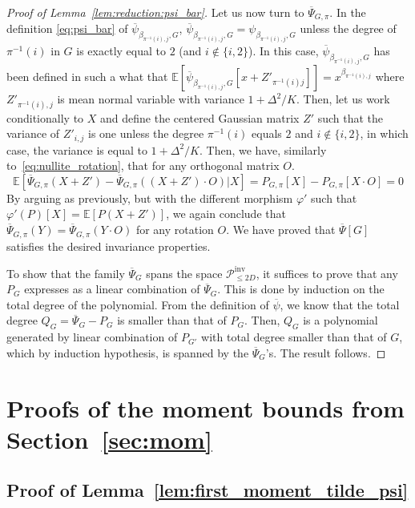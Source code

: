 \documentclass{article}
\begin{document}
\begin{proof}[Proof of Lemma~\ref{lem:reduction:psi_bar}]
Let us now turn to $\overline{\Psi}_{G,\pi}$. In the definition \eqref{eq:psi_bar} of $\overline{\psi}_{{\beta_{\pi^{-1}(i),j},G}}$, $\overline{\psi}_{{\beta_{\pi^{-1}(i),j},G}}= \psi_{{\beta_{\pi^{-1}(i),j},G}}$ unless the degree of $\pi^{-1}(i)$ in $G$ is exactly equal to $2$  (and $i\notin\{i,2\}$). In this case, $\overline{\psi}_{\beta_{\pi^{-1}(i),j},G}$ has been defined in such a what that $\mathbb{E}[\overline{\psi}_{\beta_{\pi^{-1}(i),j},G}[x+ Z'_{\pi^{-1}(i)j}]]= x^{\beta_{\pi^{-1}(i),j}}$ where $Z'_{\pi^{-1}(i),j}$ is mean normal variable with variance $1+\Delta^2/K$. Then, let us work conditionally to $X$ and define the centered Gaussian matrix $Z'$ such that the variance of $Z'_{i,j}$ is one unless the degree $\pi^{-1}(i)$ equals $2$ and $i\notin\{i,2\}$, in which case, the variance is equal to $1+\Delta^2/K$. Then, we have, similarly to~\eqref{eq:nullite_rotation}, that for any orthogonal matrix $O$. 
\[
\mathbb{E}[\overline{\Psi}_{G,\pi}(X+Z')- \overline{\Psi}_{G,\pi}((X+Z')\cdot O)|X]= P_{G,\pi}[X] - P_{G,\pi}[X\cdot O]=0
\]
By arguing as previously, but with the different morphism $\varphi'$ such that $\varphi'(P)[X]= \mathbb{E}[P(X+Z')]$, we again conclude that 
$\overline{\Psi}_{G,\pi}(Y)= \overline{\Psi}_{G,\pi}(Y\cdot O)$ for any rotation $O$. We have proved that $\overline{\Psi}[G]$ satisfies the desired invariance properties. 


To show that the family $\overline{\Psi}_G$ spans the space $\mathcal{P}^{\mathrm{\mathrm{inv}}}_{\leq 2D}$, it suffices to prove that any $P_G$ expresses as a linear combination of $\overline{\Psi}_{G}$. This is done by induction on the total degree of the polynomial. From the definition of $\overline{\psi}$, we know  that the total degree $Q_G= \overline{\Psi}_{G}- P_{G}$ is smaller than that of $P_{G}$. Then, $Q_G$ is a polynomial generated by linear combination of $P_{G'}$ with total degree smaller than that of $G$, which by induction hypothesis, is spanned by the $\overline{\Psi}_{G}$'s. The result follows. 
\end{proof}




\section{Proofs of the moment bounds from Section~\ref{sec:mom}}\label{sec:proof:moment}



\subsection{Proof of Lemma~\ref{lem:first_moment_tilde_psi}}
\end{document}
